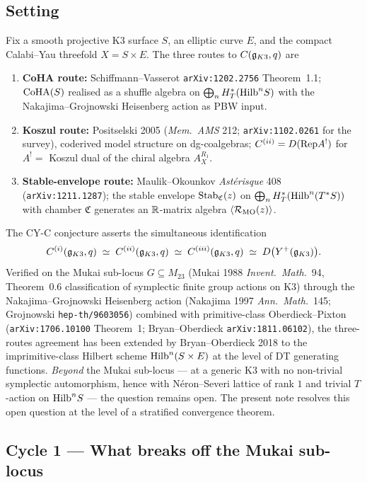 \subsection{Setting}

Fix a smooth projective K$3$ surface $S$, an elliptic curve $E$,
and the compact Calabi--Yau threefold $X = S \times E$. The three
routes to $C(\mathfrak{g}_{K3}, q)$ are
\begin{enumerate}[label=\textup{(\roman*)}]
\item \textbf{CoHA route:} Schiffmann--Vasserot
\texttt{arXiv:1202.2756} Theorem~1.1; $\mathrm{CoHA}(S)$ realised as a
shuffle algebra on $\bigoplus_n H^*_T(\mathrm{Hilb}^n S)$ with the
Nakajima--Grojnowski Heisenberg action as PBW input.
\item \textbf{Koszul route:} Positselski 2005
(\emph{Mem.\ AMS} 212; \texttt{arXiv:1102.0261} for the survey),
coderived model structure on dg-coalgebras; $C^{(ii)} = D(\mathrm{Rep} A^!)$
for $A^! = $ Koszul dual of the chiral algebra $A_X^{R_1}$.
\item \textbf{Stable-envelope route:} Maulik--Okounkov
\emph{Ast\'erisque} 408 (\texttt{arXiv:1211.1287}); the stable
envelope $\mathrm{Stab}_{\mathfrak{C}}(z)$ on
$\bigoplus_n H^*_T(\mathrm{Hilb}^n(T^*S))$ with chamber $\mathfrak{C}$
generates an $\mathbb{R}$-matrix algebra $\langle \mathcal{R}_{\mathrm{MO}}(z) \rangle$.
\end{enumerate}
The CY-C conjecture asserts the simultaneous identification
\[
  C^{(i)}(\mathfrak{g}_{K3}, q)
  \;\simeq\;
  C^{(ii)}(\mathfrak{g}_{K3}, q)
  \;\simeq\;
  C^{(iii)}(\mathfrak{g}_{K3}, q)
  \;\simeq\;
  D\bigl(Y^{+}(\mathfrak{g}_{K3})\bigr).
\]
Verified on the Mukai sub-locus $G \subseteq M_{23}$ (Mukai 1988
\emph{Invent.\ Math.}\ 94, Theorem~0.6 classification of symplectic
finite group actions on K$3$) through the Nakajima--Grojnowski
Heisenberg action (Nakajima 1997 \emph{Ann.\ Math.}\ 145; Grojnowski
\texttt{hep-th/9603056}) combined with primitive-class Oberdieck--Pixton
(\texttt{arXiv:1706.10100} Theorem~1; Bryan--Oberdieck
\texttt{arXiv:1811.06102}), the three-routes agreement has been
extended by Bryan--Oberdieck 2018 to the imprimitive-class Hilbert
scheme $\mathrm{Hilb}^n(S \times E)$ at the level of DT generating functions.
\emph{Beyond} the Mukai sub-locus --- at a generic K$3$ with no
non-trivial symplectic automorphism, hence with N\'eron--Severi lattice
of rank $1$ and trivial $T$-action on $\mathrm{Hilb}^n S$ --- the question
remains open. The present note resolves this open question at the
level of a stratified convergence theorem.

\subsection{Cycle 1 --- What breaks off the Mukai sub-locus}

